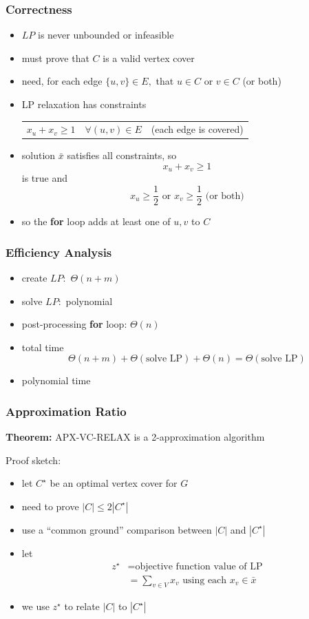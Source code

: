 \documentclass[10pt,aspectratio=169]{beamer}
\begin{document}
\begin{frame} \frametitle{Correctness}
\begin{itemize}
  \item $LP$ is never unbounded or infeasible
  \item must prove that $C$ is a valid vertex cover
  \item need, for each edge $\{u, v\} \in E,$ that $u \in C$ or $v \in C$ (or both)
  \item LP relaxation has constraints
    \begin{tabular}{lll}
      $x_u + x_v \geq 1$ & $\forall (u, v) \in E$ & (each edge is covered)
    \end{tabular}
  \item solution $\bar{x}$ satisfies all constraints, so
    \[  x_u + x_v \geq 1 \]
    is true and
    \[ x_u \geq \frac{1}{2} \text{ or } x_v \geq \frac{1}{2} \text{ (or both)}\]
  \item so the \textbf{for} loop adds at least one of $u, v$ to $C$
\end{itemize}
\end{frame}

\begin{frame} \frametitle{Efficiency Analysis}
  \begin{itemize}
    \item create $LP:$ $\Theta(n+m)$
    \item solve $LP:$ polynomial
    \item post-processing \textbf{for} loop: $\Theta(n)$
    \item total time
      \[ \Theta(n+m) + \Theta(\text{solve LP}) + \Theta(n) = \Theta(\text{solve LP}) \]
    \item polynomial time
  \end{itemize}
\end{frame}

\begin{frame} \frametitle{Approximation Ratio}
  \textbf{Theorem:} APX-VC-RELAX is a 2-approximation algorithm

  Proof sketch:
  \begin{itemize}
    \item let $C^\star$ be an optimal vertex cover for $G$
    \item need to prove $|C| \leq 2 |C^\star|$
    \item use a ``common ground'' comparison between $|C|$ and $|C^\star|$
    \item let
      \begin{align*}
        z^\star &= \text{objective function value of LP} \\
        &= \sum_{v \in V} x_v \text{ using each } x_v \in \bar{x}
      \end{align*}
    \item we use $z^\star$ to relate $|C|$ to $|C^\star|$
  \end{itemize}
\end{frame}
\end{document}
